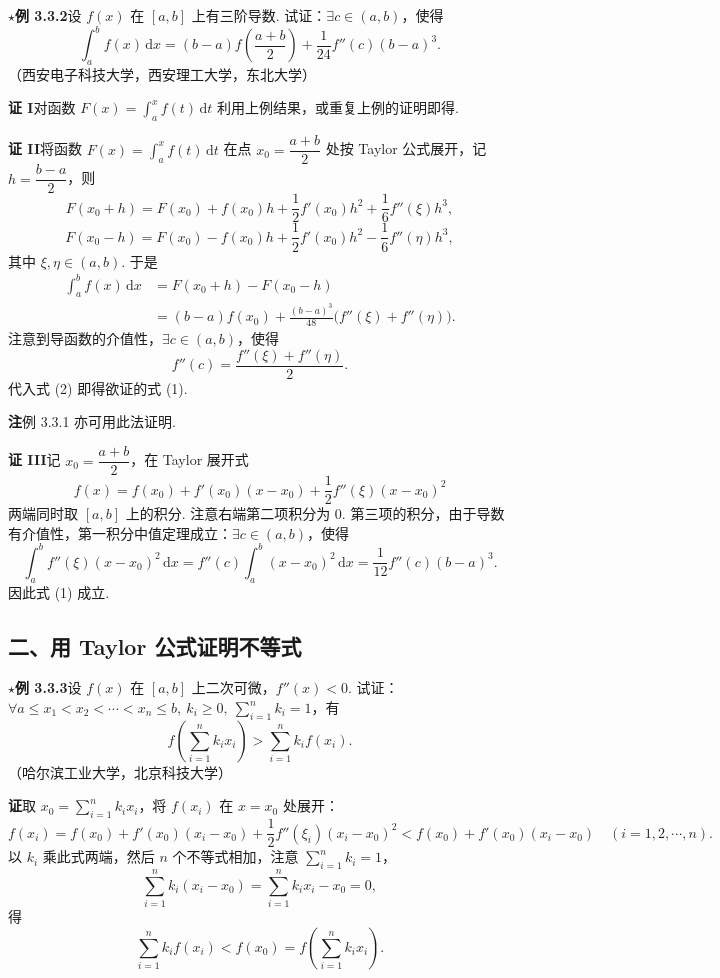 \documentclass[UTF8, 12pt, fontset=fandol, oneside]{ctexart}
\begin{document}
\noindent\textbf{$\star$例 3.3.2}\quad 设 $f(x)$ 在 $[a,b]$ 上有三阶导数. 试证：$\exists c\in(a,b)$，使得
\begin{equation}
  \int_a^b f(x)\,\mathrm dx
  =(b-a)f\left(\frac{a+b}{2}\right)+\frac1{24}f''(c)(b-a)^3.
\tag{1}
\end{equation}
（西安电子科技大学，西安理工大学，东北大学）

\noindent\textbf{证 I}\quad 对函数 $F(x)=\int_a^x f(t)\,\mathrm dt$ 利用上例结果，或重复上例的证明即得.

\noindent\textbf{证 II}\quad 将函数 $F(x)=\int_a^x f(t)\,\mathrm dt$ 在点 $x_0=\dfrac{a+b}{2}$ 处按 Taylor 公式展开，记 $h=\dfrac{b-a}{2}$，则
\[
  F(x_0+h)=F(x_0)+f(x_0)h+\frac12f'(x_0)h^2+\frac16f''(\xi)h^3,
\]
\[
  F(x_0-h)=F(x_0)-f(x_0)h+\frac12f'(x_0)h^2-\frac16f''(\eta)h^3,
\]
其中 $\xi,\eta\in(a,b)$. 于是
\[
\begin{aligned}
\int_a^b f(x)\,\mathrm dx
&=F(x_0+h)-F(x_0-h)\\
&=(b-a)f(x_0)+\frac{(b-a)^3}{48}\bigl(f''(\xi)+f''(\eta)\bigr).
\end{aligned}
\tag{2}
\]
注意到导函数的介值性，$\exists c\in(a,b)$，使得
\[
  f''(c)=\frac{f''(\xi)+f''(\eta)}2.
\]
代入式 (2) 即得欲证的式 (1).

\noindent\textbf{注}\quad 例 3.3.1 亦可用此法证明.

\noindent\textbf{证 III}\quad 记 $x_0=\dfrac{a+b}{2}$，在 Taylor 展开式
\[
  f(x)=f(x_0)+f'(x_0)(x-x_0)+\frac12f''(\xi)(x-x_0)^2
\]
两端同时取 $[a,b]$ 上的积分. 注意右端第二项积分为 0. 第三项的积分，由于导数有介值性，第一积分中值定理成立：$\exists c\in(a,b)$，使得
\[
  \int_a^b f''(\xi)(x-x_0)^2\,\mathrm dx
  =
  f''(c)\int_a^b (x-x_0)^2\,\mathrm dx
  =
  \frac1{12}f''(c)(b-a)^3.
\]
因此式 (1) 成立.

\subsection*{二、用 Taylor 公式证明不等式}

\noindent\textbf{$\star$例 3.3.3}\quad 设 $f(x)$ 在 $[a,b]$ 上二次可微，$f''(x)<0$. 试证：$\forall a\le x_1<x_2<\cdots<x_n\le b,\ k_i\ge0,\ \sum\limits_{i=1}^n k_i=1$，有
\[
  f\left(\sum_{i=1}^n k_ix_i\right)>\sum_{i=1}^n k_if(x_i).
\]
（哈尔滨工业大学，北京科技大学）

\noindent\textbf{证}\quad 取 $x_0=\sum\limits_{i=1}^n k_ix_i$，将 $f(x_i)$ 在 $x=x_0$ 处展开：
\[
  f(x_i)=f(x_0)+f'(x_0)(x_i-x_0)+\frac12f''(\xi_i)(x_i-x_0)^2
  <f(x_0)+f'(x_0)(x_i-x_0)\quad(i=1,2,\cdots,n).
\]
以 $k_i$ 乘此式两端，然后 $n$ 个不等式相加，注意 $\sum\limits_{i=1}^n k_i=1$，
\[
  \sum_{i=1}^n k_i(x_i-x_0)=\sum_{i=1}^n k_ix_i-x_0=0,
\]
得
\[
  \sum_{i=1}^n k_if(x_i)<f(x_0)=f\left(\sum_{i=1}^n k_ix_i\right).
\]
\end{document}
